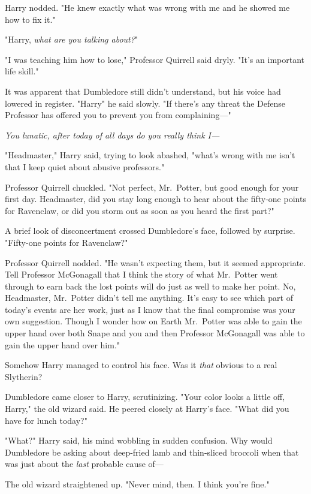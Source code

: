 Harry nodded. "He knew exactly what was wrong with me and he showed me how to
fix it."

"Harry, \emph{what are you talking about?}"

"I was teaching him how to lose," Professor Quirrell said dryly. "It's an
important life skill."

It was apparent that Dumbledore still didn't understand, but his voice had
lowered in register. "Harry{\el}" he said slowly. "If there's any threat the
Defense Professor has offered you to prevent you from complaining—"

\emph{You lunatic, after today of all days do you really think I—}

"Headmaster," Harry said, trying to look abashed, "what's wrong with me isn't
that I keep quiet about abusive professors."

Professor Quirrell chuckled. "Not perfect, Mr.~Potter, but good enough for your
first day. Headmaster, did you stay long enough to hear about the fifty-one
points for Ravenclaw, or did you storm out as soon as you heard the first part?"

A brief look of disconcertment crossed Dumbledore's face, followed by surprise.
"Fifty-one points for Ravenclaw?"

Professor Quirrell nodded. "He wasn't expecting them, but it seemed
appropriate. Tell Professor McGonagall that I think the story of what
Mr.~Potter went through to earn back the lost points will do just as well to
make her point. No, Headmaster, Mr.~Potter didn't tell me anything. It's easy
to see which part of today's events are her work, just as I know that the final
compromise was your own suggestion. Though I wonder how on Earth Mr.~Potter was
able to gain the upper hand over both Snape and you and then Professor
McGonagall was able to gain the upper hand over him."

Somehow Harry managed to control his face. Was it \emph{that} obvious to a real
Slytherin?

Dumbledore came closer to Harry, scrutinizing. "Your color looks a little off,
Harry," the old wizard said. He peered closely at Harry's face. "What did you
have for lunch today?"

"What?" Harry said, his mind wobbling in sudden confusion. Why would Dumbledore
be asking about deep-fried lamb and thin-sliced broccoli when that was just
about the \emph{last} probable cause of—

The old wizard straightened up. "Never mind, then. I think you're fine."

